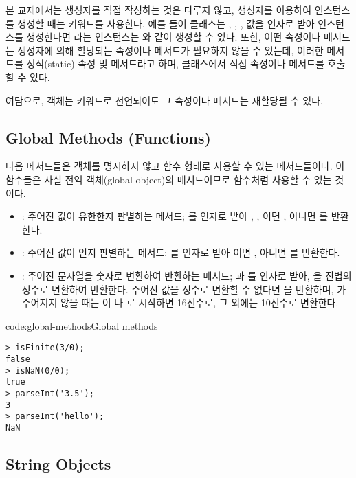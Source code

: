 본 교재에서는 생성자를 직접 작성하는 것은 다루지 않고, 생성자를 이용하여 인스턴스를 생성할 때는  키워드를 사용한다. 예를 들어  클래스는 , , ,  값을 인자로 받아 인스턴스를 생성한다면 라는 인스턴스는 와 같이 생성할 수 있다. 또한, 어떤 속성이나 메서드는 생성자에 의해 할당되는 속성이나 메서드가 필요하지 않을 수 있는데, 이러한 메서드를 정적(static) 속성 및 메서드라고 하며, 클래스에서 직접 속성이나 메서드를 호출할 수 있다.

여담으로, 객체는  키워드로 선언되어도 그 속성이나 메서드는 재할당될 수 있다.

\subsection*{Global Methods (Functions)}

다음 메서드들은 객체를 명시하지 않고 함수 형태로 사용할 수 있는 메서드들이다. 이 함수들은 사실 전역 객체(global object)의 메서드이므로 함수처럼 사용할 수 있는 것이다.

\begin{itemize}
    \item {}: 주어진 값이 유한한지 판별하는 메서드; 를 인자로 받아 , , 이면 , 아니면 를 반환한다.
    \item {}: 주어진 값이 인지 판별하는 메서드; 를 인자로 받아 이면 , 아니면 를 반환한다.
    \item {}: 주어진 문자열을 숫자로 변환하여 반환하는 메서드; 과 를 인자로 받아, 을 진법의 정수로 변환하여 반환한다. 주어진 값을 정수로 변환할 수 없다면 을 반환하며, 가 주어지지 않을 때는 이 나 로 시작하면 16진수로, 그 외에는 10진수로 변환한다.
\end{itemize}

\begin{codeenv}{code:global-methods}{Global methods}\begin{verbatim}
> isFinite(3/0);
false
> isNaN(0/0);
true
> parseInt('3.5');
3
> parseInt('hello');
NaN
\end{verbatim}
\end{codeenv}

\subsection*{String Objects}

